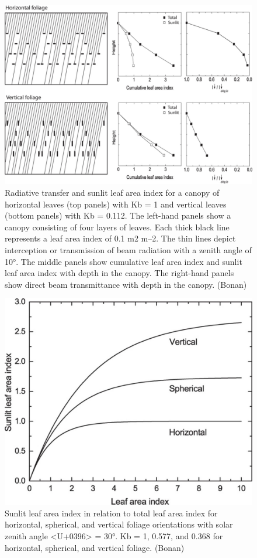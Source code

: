 \documentclass[
  oneside]{book}
\begin{document}
\begin{figure}

{\centering \includegraphics[width=0.8\linewidth]{figures/chap3/f313_sun_shade} 

}

\caption{Radiative transfer and sunlit leaf area index for a canopy of horizontal leaves (top panels) with Kb = 1 and vertical leaves (bottom panels) with Kb = 0.112. The left-hand panels show a canopy consisting of four layers of leaves. Each thick black line represents a leaf area index of 0.1 m2 m–2. The thin lines depict interception or transmission of beam radiation with a zenith angle of 10°. The middle panels show cumulative leaf area index and sunlit leaf area index with depth in the canopy. The right-hand panels show direct beam transmittance with depth in the canopy. (Bonan)}\label{fig:f313}
\end{figure}

\begin{figure}

{\centering \includegraphics[width=0.8\linewidth]{figures/chap3/f314_sunlit} 

}

\caption{Sunlit leaf area index in relation to total leaf area index for horizontal, spherical, and vertical foliage orientations with solar zenith angle <U+0396> = 30°. Kb = 1, 0.577, and 0.368 for horizontal, spherical, and vertical foliage. (Bonan)}\label{fig:f314}
\end{figure}
\end{document}
